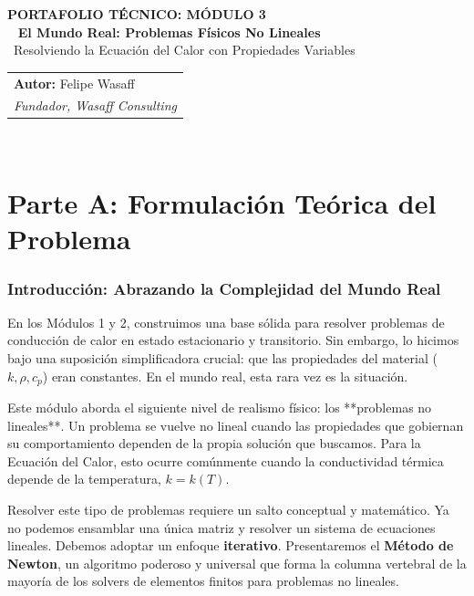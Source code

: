 \documentclass[11pt, a4paper]{article}
\begin{document}
\sffamily
{\color{WasaffCopper} \large \textbf{PORTAFOLIO TÉCNICO: MÓDULO 3}}\\
\
{\color{WasaffNavy} \huge \textbf{El Mundo Real: Problemas Físicos No Lineales}}\\
\
{\Large Resolviendo la Ecuación del Calor con Propiedades Variables}\\
\vspace{1cm}
\rmfamily
\begin{tabular}{@{}p{14cm}}
    \textbf{Autor:} Felipe Wasaff \\
    \textit{Fundador, Wasaff Consulting} \\
\end{tabular}
\
\hrulefill
\
\tableofcontents
\
\hrulefill
\
\newpage

\part*{Parte A: Formulación Teórica del Problema}

\section{Introducción: Abrazando la Complejidad del Mundo Real}
En los Módulos 1 y 2, construimos una base sólida para resolver problemas de conducción de calor en estado estacionario y transitorio. Sin embargo, lo hicimos bajo una suposición simplificadora crucial: que las propiedades del material ($k, \rho, c_p$) eran constantes. En el mundo real, esta rara vez es la situación.

Este módulo aborda el siguiente nivel de realismo físico: los **problemas no lineales**. Un problema se vuelve no lineal cuando las propiedades que gobiernan su comportamiento dependen de la propia solución que buscamos. Para la Ecuación del Calor, esto ocurre comúnmente cuando la conductividad térmica depende de la temperatura, $k = k(T)$.

Resolver este tipo de problemas requiere un salto conceptual y matemático. Ya no podemos ensamblar una única matriz y resolver un sistema de ecuaciones lineales. Debemos adoptar un enfoque \textbf{iterativo}. Presentaremos el \textbf{Método de Newton}, un algoritmo poderoso y universal que forma la columna vertebral de la mayoría de los solvers de elementos finitos para problemas no lineales.
\end{document}
